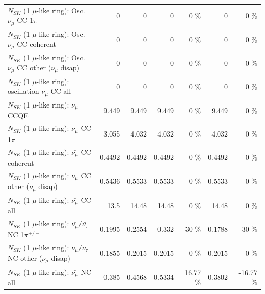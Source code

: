 \begin{table}
\begin{tabular}{| l | r | r | r  r | r  r |}
                          $N_{SK}$ (1 $\mu$-like ring): Osc. $\nu_\mu$ CC 1$\pi$ &               0 &               0 &               0 &        0 \%  &               0 &        0 \%  \\ 
                        $N_{SK}$ (1 $\mu$-like ring): Osc. $\nu_\mu$ CC coherent &               0 &               0 &               0 &        0 \%  &               0 &        0 \%  \\ 
         $N_{SK}$ (1 $\mu$-like ring): Osc. $\nu_\mu$ CC other ($\nu_\mu$ disap) &               0 &               0 &               0 &        0 \%  &               0 &        0 \%  \\ 
                      $N_{SK}$ (1 $\mu$-like ring): oscillation $\nu_\mu$ CC all &               0 &               0 &               0 &        0 \%  &               0 &        0 \%  \\ 
\hline
\hline
                              $N_{SK}$ (1 $\mu$-like ring): $\bar{\nu_\mu}$ CCQE &           9.449 &           9.449 &           9.449 &        0 \%  &           9.449 &        0 \%  \\ 
                         $N_{SK}$ (1 $\mu$-like ring): $\bar{\nu_\mu}$ CC 1$\pi$ &           3.055 &           4.032 &           4.032 &        0 \%  &           4.032 &        0 \%  \\ 
                       $N_{SK}$ (1 $\mu$-like ring): $\bar{\nu_\mu}$ CC coherent &          0.4492 &          0.4492 &          0.4492 &        0 \%  &          0.4492 &        0 \%  \\ 
        $N_{SK}$ (1 $\mu$-like ring): $\bar{\nu_\mu}$ CC other ($\nu_\mu$ disap) &          0.5436 &          0.5533 &          0.5533 &        0 \%  &          0.5533 &        0 \%  \\ 
                          $N_{SK}$ (1 $\mu$-like ring): $\bar{\nu_{\mu}}$ CC all &            13.5 &           14.48 &           14.48 &        0 \%  &           14.48 &        0 \%  \\ 
\hline
  $N_{SK}$ (1 $\mu$-like ring): $\bar{\nu_\mu}$/$\bar{\nu_\tau}$ NC 1$\pi^{+/-}$ &          0.1995 &          0.2554 &           0.332 &       30 \%  &          0.1788 &      -30 \%  \\ 
$N_{SK}$ (1 $\mu$-like ring): $\bar{\nu_\mu}$/$\bar{\nu_\tau}$ NC other ($\nu_\mu$ disap) &          0.1855 &          0.2015 &          0.2015 &        0 \%  &          0.2015 &        0 \%  \\ 
                          $N_{SK}$ (1 $\mu$-like ring): $\bar{\nu_{\mu}}$ NC all &           0.385 &          0.4568 &          0.5334 &    16.77 \%  &          0.3802 &   -16.77 \%  \\ 

\end{tabular}
\end{table}
